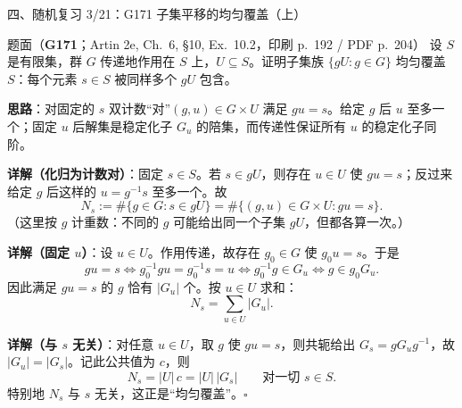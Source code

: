 \documentclass[aspectratio=169,10pt,fontset=none]{ctexbeamer}
\newcommand{\ex}[1]{\textcolor{accent}{\footnotesize\bfseries #1}}
\newcommand{\key}[1]{\textcolor{ink}{\bfseries #1}}
\begin{document}
\begin{frame}[t]{四、随机复习 3/21：G171 子集平移的均匀覆盖（上）}
\label{ex:G171}
\scriptsize
\begin{block}{\footnotesize 题面（\ex{G171}；Artin 2e, Ch.~6, §10, Ex.~10.2，印刷 p.~192 / PDF p.~204）}
设 $S$ 是有限集，群 $G$ 传递地作用在 $S$ 上，$U\subseteq S$。证明子集族 $\{gU:g\in G\}$ 均匀覆盖 $S$：每个元素 $s\in S$ 被同样多个 $gU$ 包含。
\end{block}
\key{思路}：对固定的 $s$ 双计数“对”$(g,u)\in G\times U$ 满足 $gu=s$。给定 $g$ 后 $u$ 至多一个；固定 $u$ 后解集是稳定化子 $G_u$ 的陪集，而传递性保证所有 $u$ 的稳定化子同阶。

\key{详解（化归为计数对）}：固定 $s\in S$。若 $s\in gU$，则存在 $u\in U$ 使 $gu=s$；反过来给定 $g$ 后这样的 $u=g^{-1}s$ 至多一个。故
\[ N_s:=\#\{g\in G:s\in gU\}=\#\{(g,u)\in G\times U:gu=s\}. \]
（这里按 $g$ 计重数：不同的 $g$ 可能给出同一个子集 $gU$，但都各算一次。）

\key{详解（固定 $u$）}：设 $u\in U$。作用传递，故存在 $g_0\in G$ 使 $g_0u=s$。于是
\[ gu=s\iff g_0^{-1}gu=g_0^{-1}s=u\iff g_0^{-1}g\in G_u\iff g\in g_0G_u. \]
因此满足 $gu=s$ 的 $g$ 恰有 $|G_u|$ 个。按 $u\in U$ 求和：
\[ N_s=\sum_{u\in U}|G_u|. \]

\key{详解（与 $s$ 无关）}：对任意 $u\in U$，取 $g$ 使 $gu=s$，则共轭给出 $G_s=gG_ug^{-1}$，故 $|G_u|=|G_s|$。记此公共值为 $c$，则
\[ N_s=|U|\,c=|U|\,|G_s|\qquad\text{对一切 }s\in S. \]
特别地 $N_s$ 与 $s$ 无关，这正是“均匀覆盖”。$\square$
\end{frame}
\end{document}
